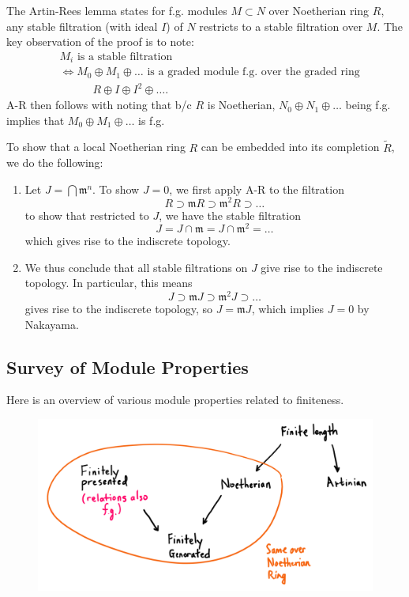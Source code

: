 The Artin-Rees lemma states for f.g. modules $M \subset N$ over Noetherian ring $R$, any stable filtration (with ideal $I$) of $N$ restricts to a stable filtration over $M$. The key observation of the proof is to note:
\[
    \begin{split}
        & M_i \text{ is a stable filtration }\\
        & \iff M_0 \oplus M_1 \oplus \dots \text{ is a graded module f.g. over the graded ring}\\
        & \quad \quad \quad R \oplus I \oplus I^2 \oplus \dots.
    \end{split}
\]
A-R then follows with noting that b/c $R$ is Noetherian, $N_0 \oplus N_1 \oplus \dots$ being f.g. implies that $M_0 \oplus M_1 \oplus \dots$ is f.g.

To show that a local Noetherian ring $R$ can be embedded into its completion $\tilde{R}$, we do the following:
\begin{enumerate}
    \item Let $J = \bigcap \mathfrak m^n$. To show $J = 0$, we first apply A-R to the filtration
    \[
        R \supset \mathfrak mR \supset \mathfrak m^2R \supset \dots
    \]
    to show that restricted to $J$, we have the stable filtration
    \[
        J = J \cap \mathfrak m = J \cap \mathfrak m^2 = \dots
    \]
    which gives rise to the indiscrete topology. 
    \item We thus conclude that all stable filtrations on $J$ give rise to the indiscrete topology. In particular, this means
    \[
        J \supset \mathfrak mJ \supset \mathfrak m^2J \supset \dots
    \]
    gives rise to the indiscrete topology, so $J = \mathfrak m J$, which implies $J = 0$ by Nakayama.
\end{enumerate}

\subsection{Survey of Module Properties}
Here is an overview of various module properties related to finiteness.
\begin{figure}[H]
    \centering
    \includegraphics[width=\linewidth]{figures/finiteness.png}
\end{figure}

